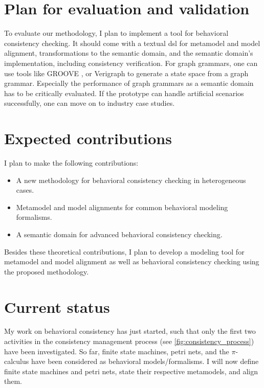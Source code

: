 \documentclass[conference]{IEEEtran}
\begin{document}
\section{Plan for evaluation and validation}
To evaluate our methodology, I plan to implement a tool for behavioral consistency checking.
It should come with a textual \gls{dsl} for metamodel and model alignment, transformations to the semantic domain, and the semantic domain's implementation, including consistency verification.
For graph grammars, one can use tools like GROOVE \cite{ghamarianModellingAnalysisUsing2012, rensinkGROOVESimulatorTool2004}, or Verigraph \cite{costaVerigraphSystemSpecification2016} to generate a state space from a graph grammar.
Especially the performance of graph grammars as a semantic domain has to be critically evaluated.
If the prototype can handle artificial scenarios successfully, one can move on to industry case studies.

\section{Expected contributions}
I plan to make the following contributions:
\begin{itemize}
    \item A new methodology for behavioral consistency checking in heterogeneous cases.
    \item Metamodel and model alignments for common behavioral modeling formalisms.
    \item A semantic domain for advanced behavioral consistency checking.
\end{itemize}
Besides these theoretical contributions, I plan to develop a modeling tool for metamodel and model alignment as well as behavioral consistency checking using the proposed methodology.
\section{Current status} \label{sec:currentStatus}
My work on behavioral consistency has just started, such that only the first two activities in the consistency management process (see \autoref{fig:consistency_process}) have been investigated.
So far, finite state machines, petri nets, and the $\pi$-calculus have been considered as behavioral models/formalisms.
I will now define finite state machines and petri nets, state their respective metamodels, and align them.
\end{document}
